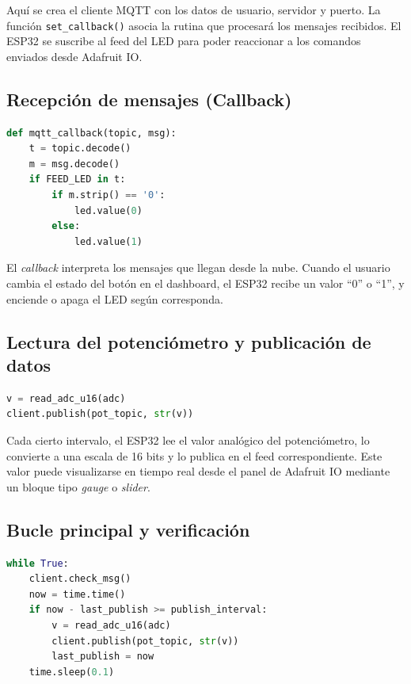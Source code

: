 \documentclass[a4paper,12pt]{article}
\begin{document}
Aquí se crea el cliente MQTT con los datos de usuario, servidor y puerto.  
La función \texttt{set\_callback()} asocia la rutina que procesará los mensajes recibidos.  
El ESP32 se suscribe al feed del LED para poder reaccionar a los comandos enviados desde Adafruit IO.

\newpage

\subsection{Recepción de mensajes (Callback)}

\begin{lstlisting}[language=Python]
def mqtt_callback(topic, msg):
    t = topic.decode()
    m = msg.decode()
    if FEED_LED in t:
        if m.strip() == '0':
            led.value(0)
        else:
            led.value(1)
\end{lstlisting}

El \textit{callback} interpreta los mensajes que llegan desde la nube.  
Cuando el usuario cambia el estado del botón en el dashboard, el ESP32 recibe un valor “0” o “1”, y enciende o apaga el LED según corresponda.

\subsection{Lectura del potenciómetro y publicación de datos}

\begin{lstlisting}[language=Python]
v = read_adc_u16(adc)
client.publish(pot_topic, str(v))
\end{lstlisting}

Cada cierto intervalo, el ESP32 lee el valor analógico del potenciómetro, lo convierte a una escala de 16 bits y lo publica en el feed correspondiente.  
Este valor puede visualizarse en tiempo real desde el panel de Adafruit IO mediante un bloque tipo \textit{gauge} o \textit{slider}.

\subsection{Bucle principal y verificación}

\begin{lstlisting}[language=Python]
while True:
    client.check_msg()
    now = time.time()
    if now - last_publish >= publish_interval:
        v = read_adc_u16(adc)
        client.publish(pot_topic, str(v))
        last_publish = now
    time.sleep(0.1)
\end{lstlisting}
\end{document}
